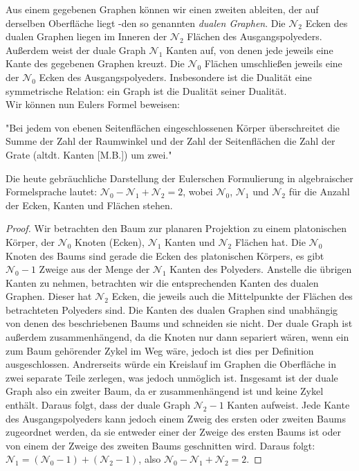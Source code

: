 Aus einem gegebenen Graphen können wir einen zweiten ableiten, der auf derselben Oberfläche liegt -den so genannten \textit{dualen Graphen}. 
Die $\mathcal{N}_2$ Ecken des dualen Graphen liegen im Inneren der $\mathcal{N}_2$ Flächen des Ausgangspolyeders. Außerdem weist der duale Graph $\mathcal{N}_1$ Kanten auf, von denen jede jeweils eine Kante des gegebenen Graphen kreuzt. Die $\mathcal{N}_0$ Flächen umschließen jeweils eine der $\mathcal{N}_0$ Ecken des Ausgangspolyeders. Insbesondere ist die Dualität eine symmetrische Relation: ein Graph ist die Dualität seiner Dualität.\\ 
Wir können nun Eulers Formel beweisen: 
\begin{theorem} 
"Bei jedem von ebenen Seitenflächen eingeschlossenen Körper überschreitet die Summe der Zahl der Raumwinkel und der Zahl der Seitenflächen die Zahl der Grate (altdt. Kanten [M.B.]) um zwei."
\end{theorem}
Die heute gebräuchliche Darstellung der Eulerschen Formulierung in algebraischer Formelsprache lautet:
$\mathcal{N}_0 - \mathcal{N}_1 + \mathcal{N}_2 =2 $, wobei $\mathcal{N}_0$, $\mathcal{N}_1$ und $\mathcal{N}_2$ für die Anzahl der Ecken, Kanten und Flächen stehen.
\begin{proof}
Wir betrachten den Baum zur planaren Projektion zu einem platonischen Körper, der $\mathcal{N}_0$ Knoten (Ecken), $\mathcal{N}_1$ Kanten und $\mathcal{N}_2$ Flächen hat. Die $\mathcal{N}_0$ Knoten des Baums sind gerade die Ecken des platonischen Körpers, es gibt $\mathcal{N}_0 -1$ Zweige aus der Menge der $\mathcal{N}_1$ Kanten des Polyeders. Anstelle die übrigen Kanten zu nehmen, betrachten wir die entsprechenden Kanten des dualen Graphen. Dieser hat $\mathcal{N}_2$ Ecken, die jeweils auch die Mittelpunkte der Flächen des betrachteten Polyeders sind. Die Kanten des dualen Graphen sind unabhängig von denen des beschriebenen Baums und schneiden sie nicht. Der duale Graph ist außerdem zusammenhängend, da die Knoten nur dann separiert wären, wenn ein zum Baum gehörender Zykel im Weg wäre, jedoch ist dies per Definition ausgeschlossen. Andrerseits würde ein Kreislauf im Graphen die Oberfläche in zwei separate Teile zerlegen, was jedoch unmöglich ist. Insgesamt ist der duale Graph also ein zweiter Baum, da er zusammenhängend ist und keine Zykel enthält. Daraus folgt, dass der duale Graph $\mathcal{N}_2-1$ Kanten aufweist. Jede Kante des Ausgangspolyeders kann jedoch einem Zweig des ersten oder zweiten Baums zugeordnet werden, da sie entweder einer der Zweige des ersten Baums ist oder von einem der Zweige des zweiten Baums geschnitten wird. Daraus folgt: $\mathcal{N}_1 = (\mathcal{N}_0-1) + (\mathcal{N}_2-1)$, also $\mathcal{N}_0 - \mathcal{N}_1 + \mathcal{N}_2 =2 $. 
\end{proof}
